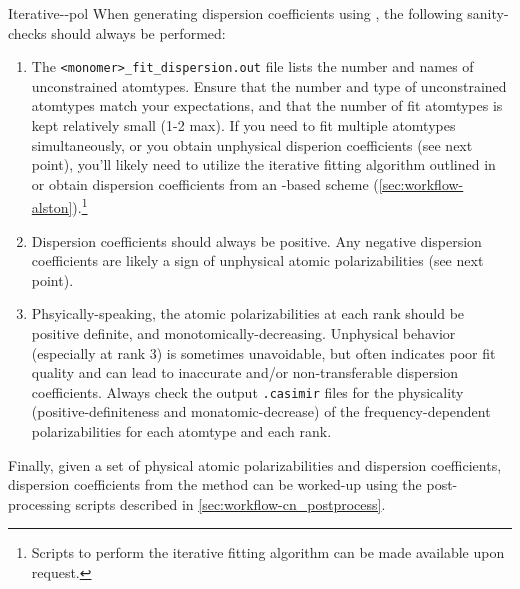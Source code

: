 \begin{subsubsection}{Iterative-\dma-pol}
When generating dispersion coefficients using \idma, the following sanity-checks should
always be performed:
\begin{enumerate}
\item The \verb|<monomer>_fit_dispersion.out| file lists the number and names of
unconstrained atomtypes. Ensure that the number and type of unconstrained atomtypes match your
expectations, and that the number of fit atomtypes is kept relatively small
(1-2 max). If you need to fit multiple atomtypes simultaneously, or you obtain
unphysical disperion coefficients (see next point), you'll likely need to
utilize the iterative fitting algorithm outlined in 
 or obtain dispersion coefficients from an \isa-based
scheme (\cref{sec:workflow-alston}).\footnote{Scripts to perform the iterative
\idma fitting algorithm can be made available upon request.}
%
\item Dispersion coefficients should always be positive. Any negative
dispersion coefficients are likely a sign of unphysical atomic
polarizabilities (see next point).
%
\item Phsyically-speaking, the atomic polarizabilities at each rank should be positive
definite, and monotomically-decreasing.\cite{Williams20013,stone2013theory} Unphysical behavior (especially at
rank 3) is sometimes unavoidable, but often indicates poor fit quality and can
lead to inaccurate and/or non-transferable dispersion coefficients. Always
check the output \verb|.casimir| files for the physicality
(positive-definiteness and monatomic-decrease) of the frequency-dependent
polarizabilities for each atomtype and each rank.
%
\end{enumerate}

Finally, given a set of physical atomic polarizabilities and dispersion
coefficients, dispersion coefficients from the \idma method can be worked-up
using the post-processing scripts described in
\cref{sec:workflow-cn_postprocess}.
\end{subsubsection}







